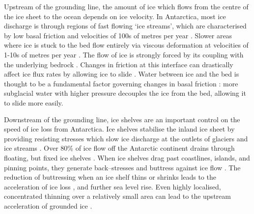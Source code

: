 
Upstream of the grounding line, the amount of ice which flows from the centre of the ice sheet to the ocean depends on ice velocity.  In Antarctica, most ice discharge is through regions of fast flowing `ice streams', which  are characterised by low basal friction and velocities of 100s of metres per year \citep{rignot2011ice}. Slower areas where ice is stuck to the bed flow entirely via viscous deformation at velocities of 1-10s of metres per year \citep{rignot2011ice, morlighem2013inversion}.
The flow of ice is strongly forced by its coupling with the underlying bedrock \citep[e.g.][]{rose1979characteristics,engelhardt1990physical}. Changes in friction at this interface can drastically affect ice flux rates by allowing ice to slide \citep{budd1979empirical}. 
Water between ice and the bed is thought to be a fundamental factor governing changes in basal friction \citep{weertman1957sliding,iken1986combined, alley1989water}:
more subglacial water with higher pressure decouples the ice from the bed, allowing it to slide more easily. 

Downstream of the grounding line, ice shelves  are an important control on the speed of ice loss from Antarctica. Ice shelves stabilise the inland ice sheet by  providing resisting stresses which slow ice discharge at the outlets of glaciers and ice streams \citep{dupont2005assessment}. Over 80\% of ice flow off the Antarctic continent drains through floating, but fixed ice shelves \citep{pritchard2012antarctic}. When ice shelves drag past coastlines, islands, and pinning points, they generate back--stresses and buttress against ice flow \citep{dupont2005assessment, furst2016safety}.   The reduction of buttressing when an ice shelf thins or shrinks leads to the acceleration of ice loss \citep{rignot2004accelerated, berthier2012mass}, and further sea level rise. Even highly localised, concentrated thinning over a relatively small area can lead to the upstream acceleration of grounded ice \citep{reese2018far}.

